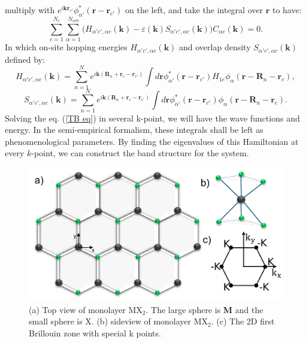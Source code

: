 \documentclass[12pt,english,a4paper]{article}
\begin{document}
	multiply with $e^{i\textbf{k}\textbf{r}_{c'}} \phi_{\alpha'}^* (\textbf{r}-\textbf{r}_{c'})$ on the left, and take the integral over $\textbf{r}$ to have:
	\begin{equation}
		\label{TB eq}
	\sum_{c=1}^{N_c} \sum_{\alpha = 1}^{N_{orb}}\big(H_{\alpha'c',\alpha c}(\textbf{k}) - \varepsilon(\textbf{k})S_{\alpha'c',\alpha c}(\textbf{k})\big) C_{\alpha c}(\textbf{k}) =0.
	\end{equation}
	In which on-site hopping energies $H_{\alpha'c',\alpha c}(\textbf{k})$ and overlap density $S_{\alpha'c',\alpha c}(\textbf{k})$ defined by:
	\begin{equation}
		H_{\alpha'c',\alpha c}(\textbf{k}) = \sum_{n=1}^N e^{i\textbf{k}(\textbf{R}_n +\textbf{r}_c -\textbf{r}_{c'})} \int d\textbf{r} \phi^*_{\alpha'}(\textbf{r}-\textbf{r}_{c'}) H_{1e} \phi_{\alpha}(\textbf{r}-\textbf{R}_n -\textbf{r}_c),
		\label{hopping energies}
	\end{equation}
	\begin{equation}
		S_{\alpha'c',\alpha c}(\textbf{k}) = \sum_{n=1}^N e^{i\textbf{k}(\textbf{R}_n +\textbf{r}_c -\textbf{r}_{c'})} \int d\textbf{r} \phi^*_{\alpha'}(\textbf{r}-\textbf{r}_{c'}) \phi_{\alpha}(\textbf{r}-\textbf{R}_n -\textbf{r}_c).
	\end{equation}
	\quad Solving the eq. (\ref{TB eq}) in several k-point, we will have the wave functions and energy. In the semi-empirical formalism, these integrals shall be left as phenomenological parameters. By finding the eigenvalues of this Hamiltonian at every $k$-point, we can construct the band structure for the system.
	
	\begin{figure}
		\begin{center}
			\includegraphics[width=0.75\linewidth]{Images/RS.pdf}
			\caption[TMD structure and its first Brillouin zone]{(a) Top view of monolayer $\mathrm{MX}_2$. The large sphere is \textbf{M} and the small sphere is X. (b) sideview of monolayer $\mathrm{MX}_2$. (c) The 2D first Brillouin zone with special k points.}
			\label{real space}
		\end{center}
	\end{figure}
\end{document}
